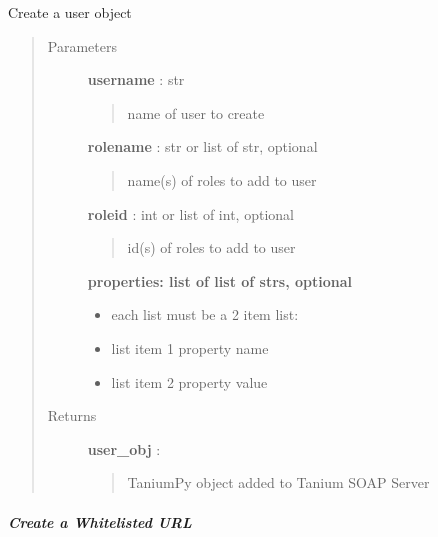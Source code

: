 \documentclass[letterpaper,10pt,english]{sphinxmanual}
\begin{document}
\begin{fulllineitems}
\label{pytan.handler:pytan.handler.Handler.create_user}
Create a user object
\begin{quote}\begin{description}
\item[{Parameters}] \leavevmode
\textbf{username} : str
\begin{quote}

name of user to create
\end{quote}

\textbf{rolename} : str or list of str, optional
\begin{quote}

name(s) of roles to add to user
\end{quote}

\textbf{roleid} : int or list of int, optional
\begin{quote}

id(s) of roles to add to user
\end{quote}

\textbf{properties: list of list of strs, optional}
\begin{itemize}
\item {} 
each list must be a 2 item list:

\item {} 
list item 1 property name

\item {} 
list item 2 property value

\end{itemize}

\item[{Returns}] \leavevmode
\textbf{user\_obj} : {\hyperref[taniumpy.object_types:taniumpy.object_types.user.User]{}}
\begin{quote}

TaniumPy object added to Tanium SOAP Server
\end{quote}

\end{description}\end{quote}

\end{fulllineitems}



\subparagraph{Create a Whitelisted URL}
\label{pytan.handler:create-a-whitelisted-url}
\end{document}
